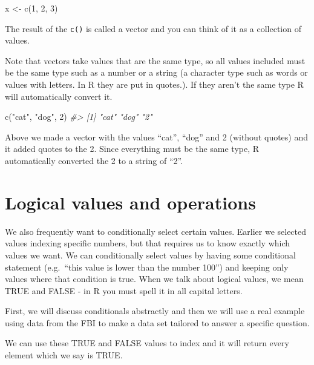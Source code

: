 \documentclass[
]{krantz}
\makeatletter
\newenvironment{Shaded}{\begin{snugshade}}{\end{snugshade}}
\newcommand{\CommentTok}[1]{\textcolor[rgb]{0.37,0.37,0.37}{\textit{#1}}}
\newcommand{\DecValTok}[1]{\textcolor[rgb]{0.06,0.06,0.06}{#1}}
\newcommand{\FunctionTok}[1]{\textcolor[rgb]{0,0,0}{#1}}
\newcommand{\NormalTok}[1]{#1}
\newcommand{\OtherTok}[1]{\textcolor[rgb]{0.37,0.37,0.37}{#1}}
\newcommand{\StringTok}[1]{\textcolor[rgb]{0.5,0.5,0.5}{#1}}
\newenvironment{kframe}{%
\medskip{}
\setlength{\fboxsep}{.8em}
 \def\at@end@of@kframe{}%
 \ifinner\ifhmode%
  \def\at@end@of@kframe{\end{minipage}}%
  \begin{minipage}{\columnwidth}%
 \fi\fi%
 \def\FrameCommand##1{\hskip\@totalleftmargin \hskip-\fboxsep
 \colorbox{shadecolor}{##1}\hskip-\fboxsep
     \hskip-\linewidth \hskip-\@totalleftmargin \hskip\columnwidth}%
 \MakeFramed {\advance\hsize-\width
   \@totalleftmargin\z@ \linewidth\hsize
   \@setminipage}}%
 {\par\unskip\endMakeFramed%
 \at@end@of@kframe}
\renewenvironment{Shaded}{\begin{kframe}}{\end{kframe}}
\makeatother
\begin{document}
\begin{Shaded}
\begin{Highlighting}[]
\NormalTok{x }\OtherTok{\textless{}{-}} \FunctionTok{c}\NormalTok{(}\DecValTok{1}\NormalTok{, }\DecValTok{2}\NormalTok{, }\DecValTok{3}\NormalTok{)}
\end{Highlighting}
\end{Shaded}

The result of the \texttt{c()} is called a vector and you can think of it as a collection of values.

Note that vectors take values that are the same type, so all values included must be the same type such as a number or a string (a character type such as words or values with letters. In R they are put in quotes.). If they aren't the same type R will automatically convert it.

\begin{Shaded}
\begin{Highlighting}[]
\FunctionTok{c}\NormalTok{(}\StringTok{"cat"}\NormalTok{, }\StringTok{"dog"}\NormalTok{, }\DecValTok{2}\NormalTok{)}
\CommentTok{\#\textgreater{} [1] "cat" "dog" "2"}
\end{Highlighting}
\end{Shaded}

Above we made a vector with the values ``cat'', ``dog'' and 2 (without quotes) and it added quotes to the 2. Since everything must be the same type, R automatically converted the 2 to a string of ``2''.

\hypertarget{logical-values-and-operations}{%
\section{Logical values and operations}\label{logical-values-and-operations}}

We also frequently want to conditionally select certain values. Earlier we selected values indexing specific numbers, but that requires us to know exactly which values we want. We can conditionally select values by having some conditional statement (e.g.~``this value is lower than the number 100'') and keeping only values where that condition is true. When we talk about logical values, we mean TRUE and FALSE - in R you must spell it in all capital letters.

First, we will discuss conditionals abstractly and then we will use a real example using data from the FBI to make a data set tailored to answer a specific question.

We can use these TRUE and FALSE values to index and it will return every element which we say is TRUE.
\end{document}
